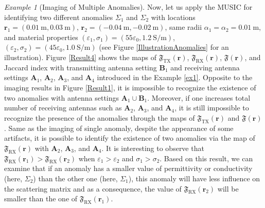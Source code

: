 \documentclass[3p,10pt]{elsarticle}
\newcommand{\eps}{\varepsilon}
\newcommand{\mr}{\mathbf{r}}
\DeclareMathOperator*{\tx}{TX}
\DeclareMathOperator*{\rx}{RX}
\theoremstyle{plain}
\theoremstyle{remark}
\newtheorem{example}{Example}[section]
\begin{document}
\begin{example}[Imaging of Multiple Anomalies]\label{ex4}
Now, let us apply the MUSIC for identifying two different anomalies $\Sigma_1$ and $\Sigma_2$ with locations $\mr_1=(\SI{0.01}{\meter},\SI{0.03}{\meter})$, $\mr_2=(-\SI{0.04}{\meter},-\SI{0.02}{\meter})$, same radii $\alpha_1=\alpha_2=\SI{0.01}{\meter}$, and material properties $(\eps_1,\sigma_1)=(55\eps_0,\SI{1.2}{\siemens/\meter})$, $(\eps_2,\sigma_2)=(45\eps_0,\SI{1.0}{\siemens/\meter})$ (see Figure \ref{IllustrationAnomalies} for an illustration). Figure \ref{Result4} shows the maps of $\mathfrak{F}_{\tx}(\mr)$, $\mathfrak{F}_{\rx}(\mr)$, $\mathfrak{F}(\mr)$, and Jaccard index with transmitting antenna setting $\mathbf{B}_1$ and receiving antenna settings $\mathbf{A}_1$, $\mathbf{A}_2$, $\mathbf{A}_3$, and $\mathbf{A}_4$ introduced in the Example \ref{ex1}. Opposite to the imaging results in Figure \ref{Result1}, it is impossible to recognize the existence of two anomalies with antenna settings $\mathbf{A}_1\cup\mathbf{B}_1$. Moreover, if one increases total number of receiving antennas such as $\mathbf{A}_2$, $\mathbf{A}_3$, and $\mathbf{A}_4$, it is still impossible to recognize the presence of the anomalies through the maps of $\mathfrak{F}_{\tx}(\mr)$ and $\mathfrak{F}(\mr)$. Same as the imaging of single anomaly, despite the appearance of some artifacts, it is possible to identify the existence of two anomalies via the map of $\mathfrak{F}_{\rx}(\mr)$ with $\mathbf{A}_2$, $\mathbf{A}_3$, and $\mathbf{A}_4$. It is interesting to observe that $\mathfrak{F}_{\rx}(\mr_1)>\mathfrak{F}_{\rx}(\mr_2)$ when $\eps_1>\eps_2$ and $\sigma_1>\sigma_2$. Based on this result, we can examine that if an anomaly has a smaller value of permittivity or conductivity (here, $\Sigma_2$) than the other one (here, $\Sigma_1$), this anomaly will have less influence on the scattering matrix and as a consequence, the value of $\mathfrak{F}_{\rx}(\mr_2)$ will be smaller than the one of $\mathfrak{F}_{\rx}(\mr_1)$.
\end{example}
\end{document}
